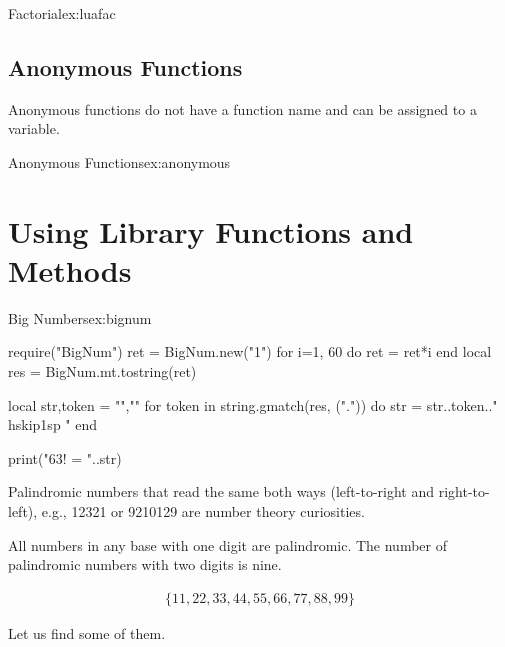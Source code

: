 \begin{texexample}{Factorial}{ex:luafac}
\end{texexample}

\subsection{Anonymous Functions}

Anonymous functions do not have a function name and can be assigned to a variable. 

\begin{texexample}{Anonymous Functions}{ex:anonymous}
\end{texexample}

\section{Using Library Functions and Methods}

\begin{texexample}{Big Numbers}{ex:bignum}
\begin{luacode}
require("BigNum")
ret = BigNum.new("1")
for i=1, 60 do
  ret = ret*i
end
local res = BigNum.mt.tostring(ret)

local str,token = "",""
for token in string.gmatch(res, (".")) do
   str = str..token.."\\hskip1sp "
end

print("63! = "..str)
\end{luacode}
\end{texexample}

Palindromic numbers that read the same both ways (left-to-right and right-to-left), 
e.g., 12321 or 9210129 are number theory curiosities.

All numbers in any base with one digit are palindromic. The number of palindromic numbers with two digits is nine.

\begin{gather}
\{11,22,33,44,55,66,77,88,99\}
\end{gather}

Let us find some of them.

